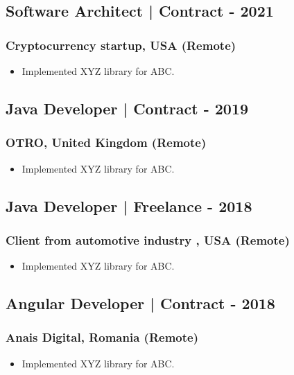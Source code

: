 \documentclass[11pt]{article}
\begin{document}
    \subsection{Software Architect | Contract \hfill {} - 2021}
    \subsubsection{Cryptocurrency startup, USA (Remote)}
    \begin{itemize}
        \item[\checkmark]  Implemented XYZ library for ABC.
    \end{itemize}
    
    \subsection{Java Developer | Contract \hfill {} - 2019}
    \subsubsection{OTRO, United Kingdom (Remote)}
    \begin{itemize}
        \item[\checkmark]  Implemented XYZ library for ABC.
    \end{itemize}
    
    \subsection{Java Developer | Freelance \hfill {} - 2018}
    \subsubsection{Client from automotive industry , USA (Remote)}
    \begin{itemize}
        \item[\checkmark]  Implemented XYZ library for ABC.
    \end{itemize}
    
    \subsection{Angular Developer | Contract \hfill {} - 2018}
    \subsubsection{Anais Digital, Romania (Remote)}
    \begin{itemize}
        \item[\checkmark]  Implemented XYZ library for ABC.
    \end{itemize}
    
\end{document}

